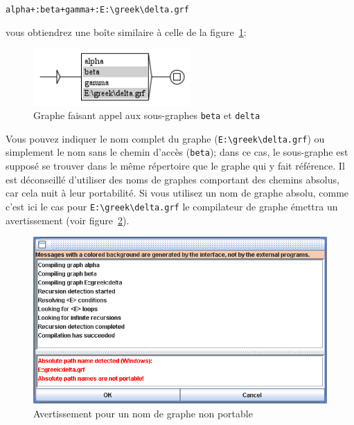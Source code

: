 \bigskip
\verb$alpha+:beta+gamma+:E:\greek\delta.grf$

\bigskip
\noindent vous obtiendrez une boîte similaire à celle de la figure~\ref{fig-subgraph-call}:

\medskip
\begin{figure}[h]
\begin{center}
\includegraphics[width=6cm]{resources/img/fig5-7.png}
\caption{Graphe faisant appel aux sous-graphes \texttt{beta} et
\texttt{delta}\label{fig-subgraph-call}}
\end{center}
\end{figure}

\noindent Vous pouvez indiquer le nom complet du graphe
(\verb$E:\greek\delta.grf$) ou simplement le nom sans le chemin d’accès
 (\verb$beta$); dans ce cas, le sous-graphe est supposé se
trouver dans le même répertoire que le graphe qui y fait référence. Il est déconseillé d’utiliser 
des noms de graphes comportant des chemins absolus, car cela nuit à leur portabilité. Si
vous utilisez un nom de graphe absolu, comme c’est ici le cas pour \verb+E:\greek\delta.grf+
le compilateur de graphe émettra un avertissement (voir
figure~\ref{fig-warning-absolute-graph-name}).

\begin{figure}[!h]
\begin{center}
\includegraphics[width=14.5cm]{resources/img/fig5-8.png}
\caption{Avertissement pour un nom de graphe non portable\label{fig-warning-absolute-graph-name}}
\end{center}
\end{figure}


